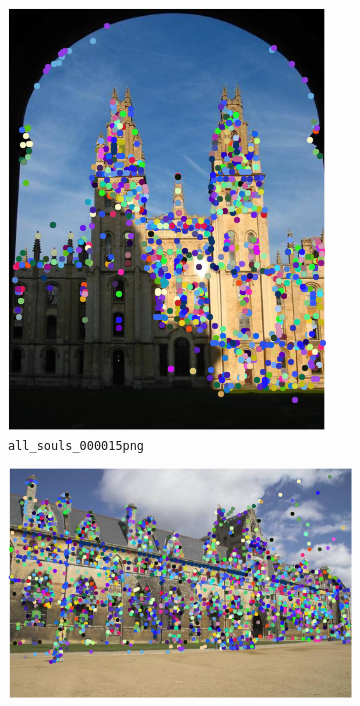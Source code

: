 \documentclass[a4paper,10pt]{article}
\begin{document}
\begin{figure}
\begin{subfigure}{0.49\textwidth}
    \includegraphics[width=\textwidth,height=.3\textheight,keepaspectratio]{randomimage3}
    \caption{\texttt{all\_souls\_000015png}}
    \label{sfig:as15}
  \end{subfigure}
  \begin{subfigure}{0.49\textwidth}
    \centering
    \includegraphics[width=\textwidth,height=.3\textheight,keepaspectratio]{randomimage4}

\end{subfigure}
\end{figure}
\end{document}

